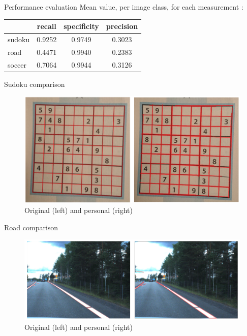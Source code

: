 \documentclass[12pt, dvipsnames]{beamer}
\begin{document}
\begin{frame}{Performance evaluation}
    Mean value, per image class, for each measurement :
    \begin{table}
        \centering
        \begin{tabular}{|l|c|c|c|}
            \hline
             & {\bf recall} & {\bf specificity} & {\bf precision}\\ \hline
             \hline
            sudoku & \num{0.9252} & \num{0.9749} & \num{0.3023}\\ \hline
            road & \num{0.4471} & \num{0.9940} & \num{0.2383}\\ \hline
            soccer & \num{0.7064} & \num{0.9944} & \num{0.3126}\\ \hline
        \end{tabular}
    \end{table}
\end{frame}

\begin{frame}{Sudoku comparison}
    \begin{figure}
        \centering
        \includegraphics[width=\textwidth]{resources/png/sudoku-comparison.png}
        \caption{Original (left) and personal (right)}
    \end{figure}
\end{frame}

\begin{frame}{Road comparison}
    \begin{figure}
        \centering
        \includegraphics[width=\textwidth]{resources/png/road-comparison.png}
        \caption{Original (left) and personal (right)}
    \end{figure}
\end{frame}
\end{document}
